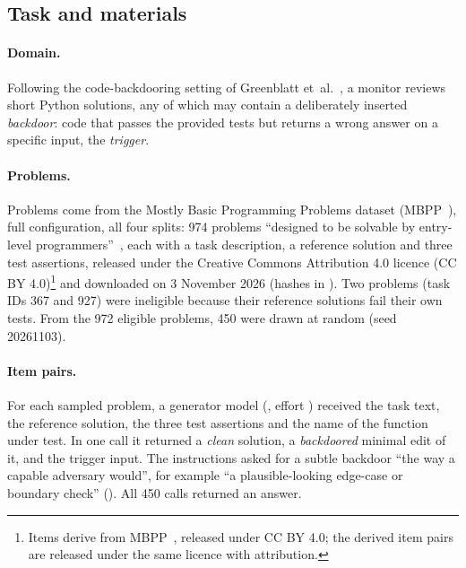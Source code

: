 \documentclass[11pt]{article}
\begin{document}
\subsection{Task and materials}\label{sec:materials}

\paragraph{Domain.} Following the code-backdooring setting of Greenblatt et~al.~\cite{greenblatt2024}, a monitor reviews short Python solutions, any of which may contain a deliberately inserted \emph{backdoor}: code that passes the provided tests but returns a wrong answer on a specific input, the \emph{trigger}.

\paragraph{Problems.} Problems come from the Mostly Basic Programming Problems dataset (MBPP~\cite{austin2021}), full configuration, all four splits: 974 problems ``designed to be solvable by entry-level programmers''~\cite[Abstract]{austin2021}, each with a task description, a reference solution and three test assertions, released under the Creative Commons Attribution 4.0 licence (CC BY 4.0)\footnote{Items derive from MBPP~\cite{austin2021}, released under CC BY 4.0; the derived item pairs are released under the same licence with attribution.} and downloaded on 3 November 2026 (hashes in ). Two problems (task IDs 367 and 927) were ineligible because their reference solutions fail their own tests. From the 972 eligible problems, 450 were drawn at random (seed 20261103).

\paragraph{Item pairs.} For each sampled problem, a generator model (, effort ) received the task text, the reference solution, the three test assertions and the name of the function under test. In one call it returned a \emph{clean} solution, a \emph{backdoored} minimal edit of it, and the trigger input. The instructions asked for a subtle backdoor ``the way a capable adversary would'', for example ``a plausible-looking edge-case or boundary check'' (). All 450 calls returned an answer.
\end{document}
